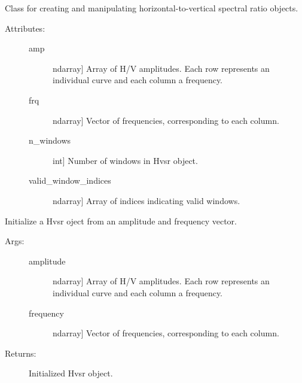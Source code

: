 \documentclass[letterpaper,10pt,english,openany,oneside]{sphinxmanual}
\begin{document}
\begin{fulllineitems}
\label{\detokenize{index:hvsrpy.Hvsr}}
Class for creating and manipulating horizontal-to-vertical
spectral ratio objects.
\begin{description}
\item[{Attributes:}] \leavevmode\begin{description}
\item[{amp}] \leavevmode{[}ndarray{]}
Array of H/V amplitudes. Each row represents an individual
curve and each column a frequency.

\item[{frq}] \leavevmode{[}ndarray{]}
Vector of frequencies, corresponding to each column.

\item[{n\_windows}] \leavevmode{[}int{]}
Number of windows in Hvsr object.

\item[{valid\_window\_indices}] \leavevmode{[}ndarray{]}
Array of indices indicating valid windows.

\end{description}

\end{description}

\begin{fulllineitems}
\label{\detokenize{index:hvsrpy.Hvsr.__init__}}
Initialize a Hvsr oject from an amplitude and frequency
vector.
\begin{description}
\item[{Args:}] \leavevmode\begin{description}
\item[{amplitude}] \leavevmode{[}ndarray{]}
Array of H/V amplitudes. Each row represents an individual
curve and each column a frequency.

\item[{frequency}] \leavevmode{[}ndarray{]}
Vector of frequencies, corresponding to each column.

\end{description}

\item[{Returns:}] \leavevmode
Initialized Hvsr object.


\end{description}
\end{fulllineitems}
\end{fulllineitems}
\end{document}
